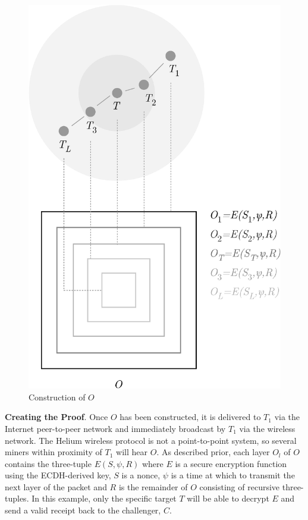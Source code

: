 \documentclass[10pt, nonatbib, nocopyrightspace, reprint]{sigplanconf}
\begin{document}
\begin{figure}[ht]
    \begin{center}
          \includegraphics[width=\columnwidth]{o_construction.eps}
          \caption{Construction of $O$}
          \label{fig:poc-o_construction}
     \end{center}
\end{figure}

\textbf{Creating the Proof}. Once $O$ has been constructed, it is delivered to $T_1$ via the Internet peer-to-peer network and immediately broadcast by $T_1$ via the wireless network. The Helium wireless protocol is not a point-to-point system, so several miners within proximity of $T_1$ will hear $O$. As described prior, each layer $O_l$ of $O$ contains the three-tuple ${E\left(S, \psi, R\right)}$ where $E$ is a secure encryption function using the ECDH-derived key, $S$ is a nonce, $\psi$ is a time at which to transmit the next layer of the packet and $R$ is the remainder of $O$ consisting of recursive three-tuples. In this example, only the specific target $T$ will be able to decrypt $E$ and send a valid receipt back to the challenger, $C$.
\end{document}
